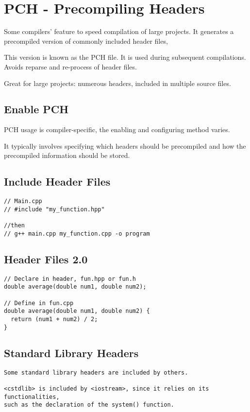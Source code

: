 \section{PCH - Precompiling Headers}

Some compilers' feature to speed compilation of large projects. 
It generates a precompiled version of commonly included header files, 

This version is known as the PCH file.
It is used during subsequent compilations. Avoids reparse and re-process of header files.

Great for large projects: numerous headers, included in multiple source files.

\subsection{Enable PCH}

PCH usage is compiler-specific, the enabling and configuring method varies. 

It typically involves specifying which headers should be precompiled and how the precompiled information should be stored.

\subsection{Include Header Files}

\begin{verbatim}
// Main.cpp
// #include "my_function.hpp"

//then
// g++ main.cpp my_function.cpp -o program
\end{verbatim}

\subsection{Header Files 2.0}

\begin{verbatim}
// Declare in header, fun.hpp or fun.h
double average(double num1, double num2);

// Define in fun.cpp
double average(double num1, double num2) {
  return (num1 + num2) / 2;
}
\end{verbatim}

\subsection{Standard Library Headers}

\begin{verbatim}
Some standard library headers are included by others. 

<cstdlib> is included by <iostream>, since it relies on its functionalities,
such as the declaration of the system() function. 
\end{verbatim}

